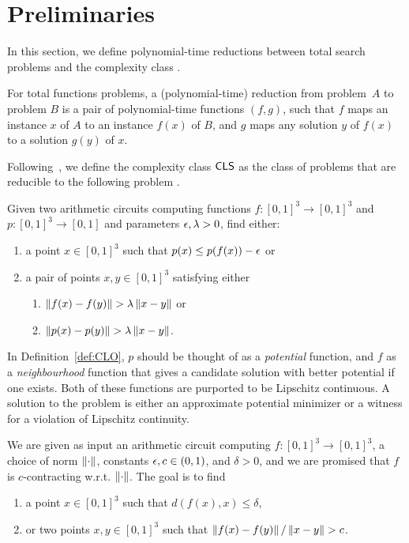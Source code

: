 \chapter{Preliminaries}

In this section, we define polynomial-time reductions between total search problems
and the complexity class \CLS.
%
\begin{definition}
For total functions problems, a (polynomial-time) reduction from problem~$A$ to
problem $B$ is a pair of polynomial-time functions $(f,g)$, such that $f$ 
maps an instance $x$ of $A$ to an instance $f(x)$ of $B$, and $g$ maps
any solution $y$ of $f(x)$ to a solution $g(y)$ of $x$.
\end{definition}
%
Following~\cite{daskalakis2011continuous}, we define the complexity class $\mathsf{CLS}$
as the class of problems that are reducible to the following problem \CLO.

\begin{definition}
\label{def:CLO}
Given two arithmetic circuits computing functions $f : [0,1]^3\to [0,1]^3$ and $p :
[0,1]^3 \to [0,1]$ and parameters $\epsilon, \lambda > 0$, find either:
\begin{enumerate}[leftmargin=*,label=(C\arabic*)]
\item a point $x\in [0,1]^3$ such that $p(x) \leq p(f(x)) - \epsilon$ or \label{c_fixpoint}
\item a pair of points $x,y\in [0,1]^3$ satisfying either \label{c_violation}
  \begin{enumerate}[label=(C\arabic{enumi}\alph*)] 
  \item $\left\| f(x) - f(y) \right\| > \lambda \left\| x-y \right\|$ or \label{c_bad_f}
  \item $\left\| p(x) - p(y) \right\| > \lambda \left\| x-y \right\|$. \label{c_bad_p}
  \end{enumerate}
\end{enumerate}
\end{definition}

In Definition~\ref{def:CLO}, $p$ should be thought of as a \emph{potential}
function, and $f$ as a \emph{neighbourhood} function that gives a candidate
solution with better potential if one exists. Both of these functions are 
purported to be Lipschitz continuous. A solution to the problem is either an approximate
potential minimizer or a witness for a violation of Lipschitz continuity.

\begin{definition}
We are given as input an arithmetic circuit computing $f: [0,1]^3\to [0,1]^3$,
a choice of norm $\left\| \cdot \right\|$, constants \mbox{$\epsilon,c \in (0,1)$},
and $\delta > 0$, and we are promised that $f$ is $c$-contracting w.r.t. $\left\| \cdot \right\|$.
The goal is to find
\begin{enumerate}[label=(CM\arabic*)]
\item a point $x\in [0,1]^3$ such that $d(f(x),x) \leq \delta$, 
\item or two points $x,y\in [0,1]^3$ such that $\left\| f(x) - f(y) \right\|/\left\| x-y \right\| > c$. 
\end{enumerate}
\end{definition}

